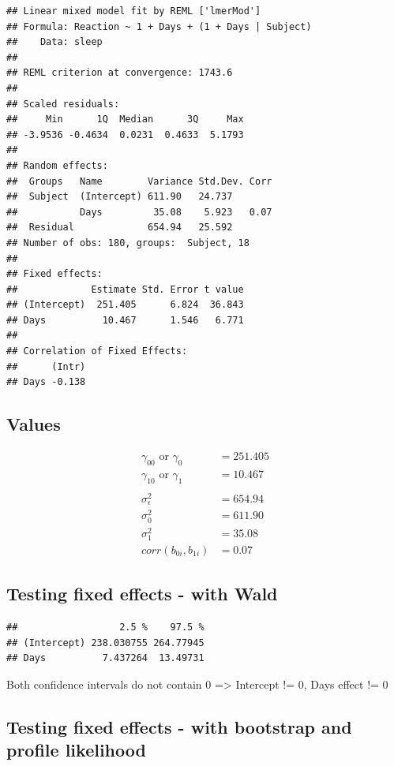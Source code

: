 \documentclass[
]{article}
\begin{document}
\begin{verbatim}
## Linear mixed model fit by REML ['lmerMod']
## Formula: Reaction ~ 1 + Days + (1 + Days | Subject)
##    Data: sleep
## 
## REML criterion at convergence: 1743.6
## 
## Scaled residuals: 
##     Min      1Q  Median      3Q     Max 
## -3.9536 -0.4634  0.0231  0.4633  5.1793 
## 
## Random effects:
##  Groups   Name        Variance Std.Dev. Corr
##  Subject  (Intercept) 611.90   24.737       
##           Days         35.08    5.923   0.07
##  Residual             654.94   25.592       
## Number of obs: 180, groups:  Subject, 18
## 
## Fixed effects:
##             Estimate Std. Error t value
## (Intercept)  251.405      6.824  36.843
## Days          10.467      1.546   6.771
## 
## Correlation of Fixed Effects:
##      (Intr)
## Days -0.138
\end{verbatim}

\hypertarget{values}{%
\subsection{Values}\label{values}}

\[\begin{align}
\gamma_{00} \text{ or } \gamma_{0}  &= 251.405 \\
\gamma_{10} \text{ or } \gamma_{1}  &= 10.467  \\
\\
\sigma_{\epsilon}^{2} &= 654.94 \\
\sigma_{0}^{2} &= 611.90 \\
\sigma_{1}^{2} &= 35.08 \\
corr(b_{0i}, b_{1i}) &= 0.07
\end{align}\]

\hypertarget{testing-fixed-effects---with-wald}{%
\subsection{Testing fixed effects - with
Wald}\label{testing-fixed-effects---with-wald}}

\begin{verbatim}
##                  2.5 %    97.5 %
## (Intercept) 238.030755 264.77945
## Days          7.437264  13.49731
\end{verbatim}

Both confidence intervals do not contain 0 =\textgreater{} Intercept !=
0, Days effect != 0

\hypertarget{testing-fixed-effects---with-bootstrap-and-profile-likelihood}{%
\subsection{Testing fixed effects - with bootstrap and profile
likelihood}\label{testing-fixed-effects---with-bootstrap-and-profile-likelihood}}
\end{document}
